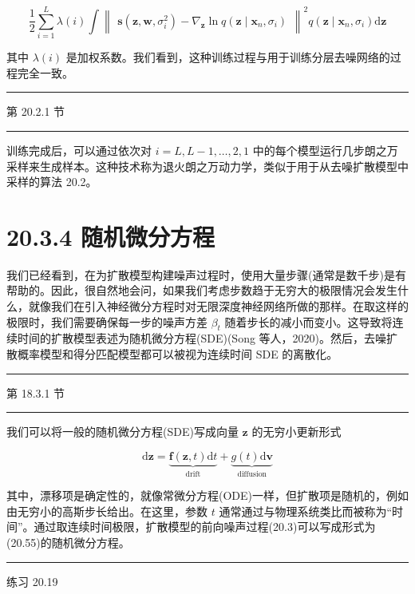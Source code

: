 \documentclass[10pt]{article}
\newcommand{\HRule}{\begin{center}\rule{0.9\linewidth}{0.2mm}\end{center}}
\begin{document}
\[
\frac{1}{2}\mathop{\sum }\limits_{{i = 1}}^{L}\lambda \left( i\right) \int {\begin{Vmatrix}\mathbf{s}\left( \mathbf{z},\mathbf{w},{\sigma }_{i}^{2}\right)  - {\nabla }_{\mathbf{z}}\ln q\left( \mathbf{z} \mid  {\mathbf{x}}_{n},{\sigma }_{i}\right) \end{Vmatrix}}^{2}q\left( {\mathbf{z} \mid  {\mathbf{x}}_{n},{\sigma }_{i}}\right) \mathrm{d}\mathbf{z} \tag{20.54}
\]

其中 \(\lambda \left( i\right)\) 是加权系数。我们看到，这种训练过程与用于训练分层去噪网络的过程完全一致。

\HRule

第 20.2.1 节

\HRule

训练完成后，可以通过依次对 \(i = L,L - 1,\ldots ,2,1\) 中的每个模型运行几步朗之万采样来生成样本。这种技术称为退火朗之万动力学，类似于用于从去噪扩散模型中采样的算法 20.2。

\section*{20.3.4 随机微分方程}

我们已经看到，在为扩散模型构建噪声过程时，使用大量步骤(通常是数千步)是有帮助的。因此，很自然地会问，如果我们考虑步数趋于无穷大的极限情况会发生什么，就像我们在引入神经微分方程时对无限深度神经网络所做的那样。在取这样的极限时，我们需要确保每一步的噪声方差 \({\beta }_{t}\) 随着步长的减小而变小。这导致将连续时间的扩散模型表述为随机微分方程(SDE)(Song 等人，2020)。然后，去噪扩散概率模型和得分匹配模型都可以被视为连续时间 SDE 的离散化。

\HRule

第 18.3.1 节

\HRule

我们可以将一般的随机微分方程(SDE)写成向量 \(\mathbf{z}\) 的无穷小更新形式

\[
\mathrm{d}\mathbf{z} = \underset{\text{ drift }}{\underbrace{\mathbf{f}\left( {\mathbf{z},t}\right) \mathrm{d}t}} + \underset{\text{ diffusion }}{\underbrace{g\left( t\right) \mathrm{d}\mathbf{v}}} \tag{20.55}
\]

其中，漂移项是确定性的，就像常微分方程(ODE)一样，但扩散项是随机的，例如由无穷小的高斯步长给出。在这里，参数 \(t\) 通常通过与物理系统类比而被称为“时间”。通过取连续时间极限，扩散模型的前向噪声过程(20.3)可以写成形式为(20.55)的随机微分方程。

\HRule

练习 20.19
\end{document}

